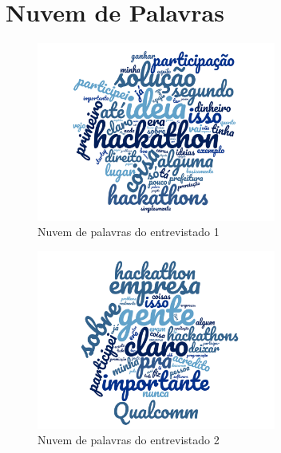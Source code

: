 



\chapter{Nuvem de Palavras}
\label{ap:nuvem}

\begin{figure}[H]
    \centering
    \includegraphics[width=0.7\textwidth]{appendix/wordcloud1.png}
    \caption{Nuvem de palavras do entrevistado 1}%
    \label{fig:nuvem-1}
\end{figure}

\begin{figure}[H]
    \centering
    \includegraphics[width=0.7\textwidth]{appendix/wordcloud2.png}
    \caption{Nuvem de palavras do entrevistado 2}%
    \label{fig:nuvem-2}
\end{figure}

